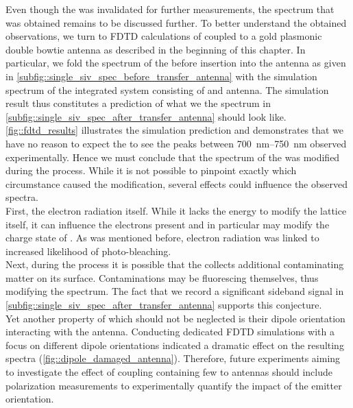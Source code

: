 				Even though the \nd was invalidated for further measurements, the spectrum that was obtained remains to be discussed further. To better understand the obtained observations, we turn to FDTD calculations of \nd coupled to a gold plasmonic double bowtie antenna as described in the beginning of this chapter. In particular, we fold the spectrum of the \nd before insertion into the antenna as given in \autoref{subfig::single_siv_spec_before_transfer_antenna} with the simulation spectrum of the integrated system consisting of \nd and antenna. The simulation result thus constitutes a prediction of what we the spectrum in \autoref{subfig::single_siv_spec_after_transfer_antenna} should look like. \autoref{fig::fdtd_results} illustrates the simulation prediction and demonstrates that we have no reason to expect the to see the peaks between \SIrange{700}{750}{nm} observed experimentally. Hence we must conclude that the spectrum of the \nd was modified during the \pp process. While it is not possible to pinpoint exactly which circumstance caused the modification, several effects could influence the observed spectra.
				\\
				First, the electron radiation itself. While it lacks the energy to modify the lattice itself, it can influence the electrons present and in particular may modify the charge state of \sivs. As was mentioned before, electron radiation was linked to increased likelihood of photo-bleaching.
				\\
				Next, during the \pp process it is possible that the \nd collects additional contaminating matter on its surface. Contaminations may be fluorescing themselves, thus modifying the spectrum. The fact that we record a significant sideband signal in \autoref{subfig::single_siv_spec_after_transfer_antenna} supports this conjecture.
				\\
				Yet another property of \sivs which should not be neglected is their dipole orientation interacting with the antenna. Conducting dedicated FDTD simulations with a focus on different dipole orientations indicated a dramatic effect on the resulting spectra (\autoref{fig::dipole_damaged_antenna}). Therefore, future experiments aiming to investigate the effect of coupling \nds containing few \sivs to antennas should include polarization measurements to experimentally quantify the impact of the emitter orientation.
				\\

